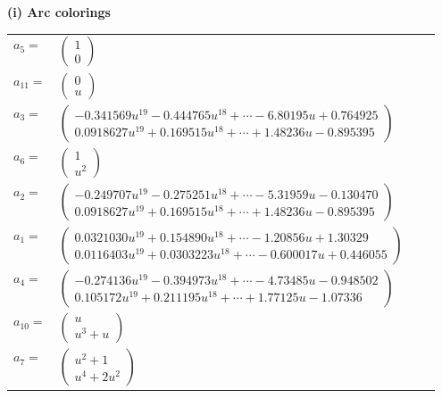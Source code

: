 \documentclass[1p]{elsarticle_modified}
\theoremstyle{definition}
\begin{document}
\flushleft \textbf{(i) Arc colorings}\\
\begin{tabular}{m{7pt} m{180pt} m{7pt} m{180pt} }
\flushright $a_{5}=$&$\begin{pmatrix}1\\0\end{pmatrix}$ \\
\flushright $a_{11}=$&$\begin{pmatrix}0\\u\end{pmatrix}$ \\
\flushright $a_{3}=$&$\begin{pmatrix}-0.341569 u^{19}-0.444765 u^{18}+\cdots-6.80195 u+0.764925\\0.0918627 u^{19}+0.169515 u^{18}+\cdots+1.48236 u-0.895395\end{pmatrix}$ \\
\flushright $a_{6}=$&$\begin{pmatrix}1\\u^2\end{pmatrix}$ \\
\flushright $a_{2}=$&$\begin{pmatrix}-0.249707 u^{19}-0.275251 u^{18}+\cdots-5.31959 u-0.130470\\0.0918627 u^{19}+0.169515 u^{18}+\cdots+1.48236 u-0.895395\end{pmatrix}$ \\
\flushright $a_{1}=$&$\begin{pmatrix}0.0321030 u^{19}+0.154890 u^{18}+\cdots-1.20856 u+1.30329\\0.0116403 u^{19}+0.0303223 u^{18}+\cdots-0.600017 u+0.446055\end{pmatrix}$ \\
\flushright $a_{4}=$&$\begin{pmatrix}-0.274136 u^{19}-0.394973 u^{18}+\cdots-4.73485 u-0.948502\\0.105172 u^{19}+0.211195 u^{18}+\cdots+1.77125 u-1.07336\end{pmatrix}$ \\
\flushright $a_{10}=$&$\begin{pmatrix}u\\u^3+u\end{pmatrix}$ \\
\flushright $a_{7}=$&$\begin{pmatrix}u^2+1\\u^4+2 u^2\end{pmatrix}$ \\

\end{tabular}
\end{document}
